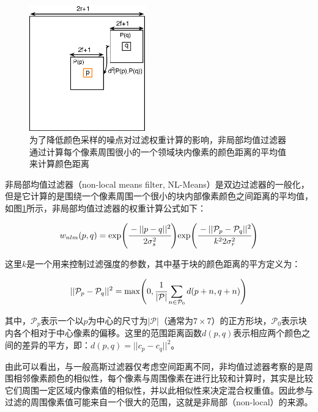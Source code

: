 \begin{figure}
	\sidecaption
	\includegraphics[width=0.45\textwidth]{figures/pt/nl-means}
	\caption{为了降低颜色采样的噪点对过滤权重计算的影响，非局部均值过滤器通过计算每个像素周围很小的一个领域块内像素的颜色距离的平均值来计算颜色距离}
	\label{f:pt-nl-means}
\end{figure}

非局部均值过滤器（non-local means filter, NL-Means）是双边过滤器的一般化，但是它计算的是围绕一个像素周围一个很小的块内部像素颜色之间距离的平均值，如图\ref{f:pt-nl-means}所示，非局部均值过滤器的权重计算公式如下：

\begin{equation}
	w_{nlm}(p,q)=\text{exp}\Biggl(  \cfrac{-||p-q||^{2}}{2\sigma^{2}_{s}}\Biggl)\text{exp}\Biggl(  \cfrac{-||\mathcal{P}_p-\mathcal{P}_q||^{2}}{k^22\sigma^{2}_{r}}\Biggl)
\end{equation}

\noindent 这里$k$是一个用来控制过滤强度的参数，其中基于块的颜色距离的平方定义为：

\begin{equation}
	||\mathcal{P}_p-\mathcal{P}_q||^{2}=\max\Biggl( 0,  \cfrac{1}{|\mathcal{P}|}\sum_{n\in\mathcal{P}_0} d(p+n,q+n)\Biggl)
\end{equation}

\noindent 其中，$\mathcal{P}_p$表示一个以$p$为中心的尺寸为$|\mathcal{P}|$（通常为$7\times 7$）的正方形块，$\mathcal{P}_0$表示块内各个相对于中心像素的偏移。这里的范围距离函数$d(p,q)$表示相应两个颜色之间的差异的平方，即：$d(p,q)=||c_p-c_q||^{2}$。

由此可以看出，与一般高斯过滤器仅考虑空间距离不同，非均值过滤器考察的是周围相邻像素颜色的相似性，每个像素与周围像素在进行比较和计算时，其实是比较它们周围一定区域内像素值的相似性，并以此相似性来决定混合权重值。因此参与过滤的周围像素值可能来自一个很大的范围，这就是非局部（non-local）的来源。





